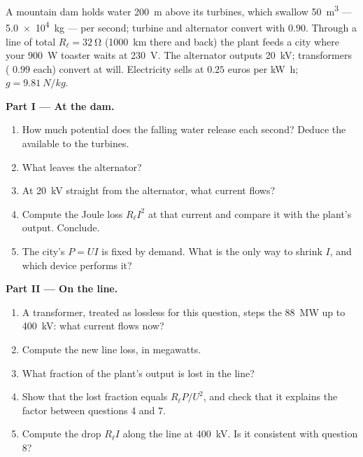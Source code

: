 \begin{problem}
\label{pb:g11:circuits-and-power:1}
A mountain dam holds water \qty{200}{m} above its turbines, which swallow
\qty{50}{m^3} --- \qty{5.0e4}{kg} --- per second; turbine and alternator
convert with  $0.90$. Through a line of total 
$R_\ell = \qty{32}{\ohm}$ (\qty{1000}{km} there and back) the plant feeds
a city where your \qty{900}{W} toaster waits at \qty{230}{V}. The
alternator outputs \qty{20}{kV}; transformers ( $0.99$ each)
convert  at will. Electricity sells at $0.25$ euros per
\unit{kW.h}; $g = \qty{9.81}{N/kg}$.

\medskip
\noindent\textbf{Part I --- At the dam.}
\begin{enumerate}
  \item How much potential  does the falling water release each
        second? Deduce the  available to the turbines.
  \item What  leaves the alternator?
  \item At \qty{20}{kV} straight from the alternator, what current flows?
  \item Compute the Joule loss $R_\ell I^2$ at that current and compare
        it with the plant's output. Conclude.
  \item The city's  $P = UI$ is fixed by demand. What is the only
        way to shrink $I$, and which device performs it?
\end{enumerate}

\medskip
\noindent\textbf{Part II --- On the line.}
\begin{enumerate}[resume]
  \item A transformer, treated as lossless for this question, steps the
        \qty{88}{MW} up to \qty{400}{kV}: what current flows now?
  \item Compute the new line loss, in megawatts.
  \item What fraction of the plant's output is lost in the line?
  \item Show that the lost fraction equals $R_\ell P/U^2$, and check that
        it explains the factor between questions 4 and 7.
  \item Compute the  drop $R_\ell I$ along the line at
        \qty{400}{kV}. Is it consistent with question 8?
\end{enumerate}


\end{problem}
